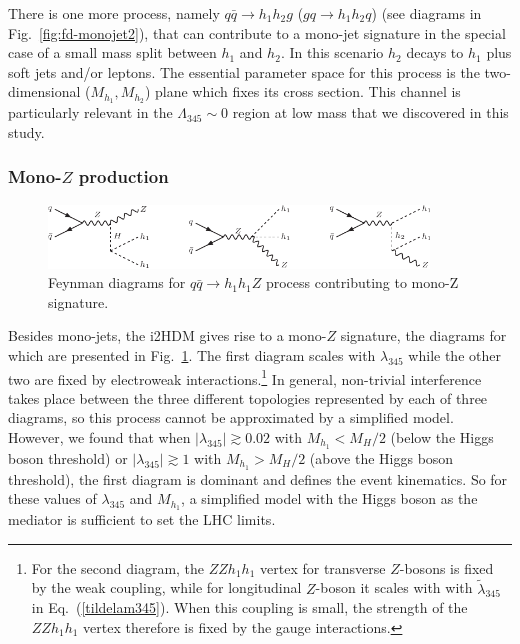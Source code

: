 \documentclass[12pt,a4paper]{article}
\newcommand {\blue} {\color{blue}}
\newcommand{\giac}[2]{{\blue #1 #2}}
\begin{document}
There is one more process, namely $q\bar{q}\to
h_1 h_2g$ ($gq\to h_1 h_2q$) (see diagrams in 
Fig.~\ref{fig:fd-monojet2}),  that can contribute to a mono-jet signature in the special case of a small mass split between $h_1$ and $h_2$.
In this scenario $h_2$ decays to $h_1$ plus soft 
jets and/or leptons. 
The essential parameter space for this process is the
two-dimensional  ($M_{h_1},M_{h_2}$) plane
which fixes its cross section. This channel is particularly relevant in the $\Lambda_{345}\sim 0$ region at low mass that we discovered in this study.

\subsubsection{Mono-$Z$ production}

%
\begin{figure}[h!]
\begin{center}
\includegraphics[width=0.9\textwidth]{fd-mono-z.pdf} 
\caption{Feynman diagrams for $q\bar{q}\to h_1 h_1Z$  process 
contributing to mono-Z signature.}
\label{fig:fd-mono-Z}
\end{center}
\end{figure}
%

Besides mono-jets, the i2HDM gives rise to a mono-$Z$ signature, the 
diagrams for which are presented in Fig.~\ref{fig:fd-mono-Z}.
The first diagram scales with $\lambda_{345}$ while the other two are fixed by electroweak interactions.\footnote{For the second diagram, the $ZZh_1h_1$ vertex for transverse $Z$-bosons is fixed by the weak coupling,
while for longitudinal $Z$-boson it scales with with $\tilde\lambda_{345}$ in Eq.~(\ref{tildelam345}). 
When this coupling is small, the strength of the  $ZZh_1h_1$ vertex therefore
is fixed by the gauge interactions.}
In general, non-trivial interference takes place between the three different topologies represented by each of three 
diagrams, so  this process cannot be approximated by a simplified model.
However, we found that when $|\lambda_{345}|\gtrsim 0.02$ with $M_{h_1}< M_H/2$ (below the Higgs boson threshold)
or $|\lambda_{345}|\gtrsim 1$ with $M_{h_1}> M_H/2$ (above the Higgs boson threshold),
the first diagram is dominant and defines the event kinematics. 
So for these values of $\lambda_{345}$ and $M_{h_1}$, a simplified
model with the Higgs boson as the mediator is sufficient to set the LHC limits.
\end{document}
